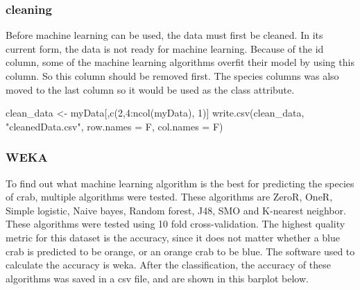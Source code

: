 \documentclass[
]{article}
\newenvironment{Shaded}{}{}
\newcommand{\AttributeTok}[1]{#1}
\newcommand{\DecValTok}[1]{#1}
\newcommand{\FunctionTok}[1]{#1}
\newcommand{\NormalTok}[1]{#1}
\newcommand{\OtherTok}[1]{\textcolor[rgb]{1.00,0.25,0.00}{#1}}
\newcommand{\SpecialCharTok}[1]{\textcolor[rgb]{0.00,0.50,0.50}{#1}}
\newcommand{\StringTok}[1]{\textcolor[rgb]{0.00,0.50,0.50}{#1}}
\begin{document}
\hypertarget{cleaning}{%
\subsubsection{cleaning}\label{cleaning}}

Before machine learning can be used, the data must first be cleaned. In
its current form, the data is not ready for machine learning. Because of
the id column, some of the machine learning algorithms overfit their
model by using this column. So this column should be removed first. The
species columns was also moved to the last column so it would be used as
the class attribute.

\begin{Shaded}
\begin{Highlighting}[]
\NormalTok{clean\_data }\OtherTok{\textless{}{-}}\NormalTok{ myData[,}\FunctionTok{c}\NormalTok{(}\DecValTok{2}\NormalTok{,}\DecValTok{4}\SpecialCharTok{:}\FunctionTok{ncol}\NormalTok{(myData), }\DecValTok{1}\NormalTok{)]}
\FunctionTok{write.csv}\NormalTok{(clean\_data, }\StringTok{"cleanedData.csv"}\NormalTok{, }\AttributeTok{row.names =}\NormalTok{ F, }\AttributeTok{col.names =}\NormalTok{ F)}
\end{Highlighting}
\end{Shaded}

\hypertarget{weka}{%
\subsubsection{WEKA}\label{weka}}

To find out what machine learning algorithm is the best for predicting
the species of crab, multiple algorithms were tested. These algorithms
are ZeroR, OneR, Simple logistic, Naive bayes, Random forest, J48, SMO
and K-nearest neighbor. These algorithms were tested using 10 fold
cross-validation. The highest quality metric for this dataset is the
accuracy, since it does not matter whether a blue crab is predicted to
be orange, or an orange crab to be blue. The software used to calculate
the accuracy is weka. After the classification, the accuracy of these
algorithms was saved in a csv file, and are shown in this barplot below.
\end{document}
